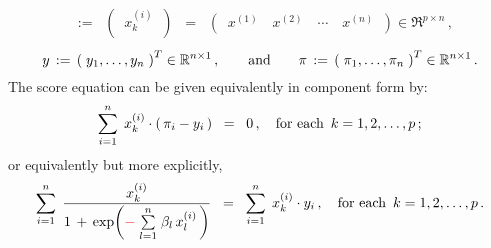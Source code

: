 \begin{proposition}
\begin{enumerate}
\begin{eqnarray*}
	\;\;:=\;\;
		\left(\;\; x^{(i)}_{k} \;\;\right)
	\;\;=\;\;
		\left(\;\; x^{(1)} \quad x^{(2)} \quad \cdots \quad x^{(n)} \;\;\right) \in \Re^{p \times n}\,,
	\end{eqnarray*}
	\begin{equation*}
	y \,:=\, \left(\;y_{1},\ldots,y_{n}\;\right)^{T} \in \Re^{n \times 1}\,, 
	\quad\quad
	\textnormal{and}	
	\quad\quad
	\pi \,:=\, \left(\;\pi_{1},\ldots,\pi_{n}\;\right)^{T} \in \Re^{n \times 1}\,.
	\end{equation*}
	The score equation can be given equivalently in component form by:
	\begin{equation*}
	\overset{n}{\underset{i=1}{\sum}}\;\, x^{(i)}_{k} \cdot \left(\,\pi_{i} - y_{i}\,\right)
	\;\; = \;\; 0\,,
	\quad
	\textnormal{for each \,$k = 1, 2,\ldots,p$}\,;
	\end{equation*}
	or equivalently but more explicitly,
	\begin{equation*}
	\overset{n}{\underset{i=1}{\sum}}\;\,
	\dfrac{x^{(i)}_{k}}{1 \,+\, \exp\!\left({\color{red}-}\;\overset{n}{\underset{l=1}{\sum}}\;\beta_{l}\,x^{(i)}_{l}\,\right)}
	\;\; = \;\;
	\overset{n}{\underset{i=1}{\sum}}\;\, x^{(i)}_{k} \cdot y_{i}\,,
	\quad
	\textnormal{for each \,$k = 1, 2,\ldots,p$}\,.
	\end{equation*}
\end{enumerate}
\end{proposition}
\proof
